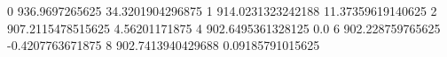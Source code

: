 0 936.9697265625 34.3201904296875
1 914.0231323242188 11.37359619140625
2 907.2115478515625 4.56201171875
4 902.6495361328125 0.0
6 902.228759765625 -0.4207763671875
8 902.7413940429688 0.09185791015625

